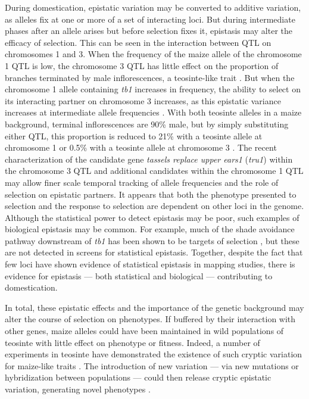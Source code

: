\documentclass[9pt,twocolumn,twoside]{rilabRxiv}
\begin{document}
During domestication, epistatic variation may be converted to additive variation, as alleles fix at one or more of a set of interacting loci.
But during intermediate phases after an allele arises but before selection fixes it, epistasis may alter the efficacy of selection.
This can be seen in the interaction between QTL on chromosomes 1 and 3.
When the frequency of the maize allele of the chromosome 1 QTL is low, the chromosome 3 QTL has little effect on the proportion of branches terminated by male inflorescences, a teosinte-like trait \citep{doebley1995}.
But when the chromosome 1 allele containing \textit{tb1} increases in frequency, the ability to select on its interacting partner on chromosome 3 increases, as this epistatic variance increases at intermediate allele frequencies \citep{goodnight2004}.
With both teosinte alleles in a maize background, terminal inflorescences are 90\% male, but by simply substituting either QTL, this proportion is reduced to 21\% with a teosinte allele at chromosome 1 or 0.5\% with a teosinte allele at chromosome 3 \citep{lukens1999}.
The recent characterization of the candidate gene \textit{tassels replace upper ears1} (\textit{tru1}) within the chromosome 3 QTL \citep{dong2017} and additional candidates within the chromosome 1 QTL \citep{yang2016} may allow finer scale temporal tracking of allele frequencies and the role of selection on epistatic partners.
It appears that both the phenotype presented to selection and the response to selection are dependent on other loci in the genome.
Although the statistical power to detect epistasis may be poor, such examples of biological epistasis may be common.
For example, much of the shade avoidance pathway downstream of \textit{tb1} has been shown to be targets of selection \citep{studer2017}, but these are not detected in screens for statistical epistasis.
Together, despite the fact that few loci have shown evidence of statistical epistasis in mapping studies, there is evidence for epistasis --- both statistical and biological --- contributing to domestication.


In total, these epistatic effects and the importance of the genetic background may alter the course of selection on phenotypes.
If buffered by their interaction with other genes, maize alleles could have been maintained in wild populations of teosinte with little effect on phenotype or fitness.
Indeed, a number of experiments in teosinte have demonstrated the existence of such cryptic variation for maize-like traits \citep{lauter2002, weber2007, weber2008, vann2015}.
The introduction of new variation --- via new mutations or hybridization between populations --- could then release cryptic epistatic variation, generating novel phenotypes \citep{doebley1995}.
\end{document}
